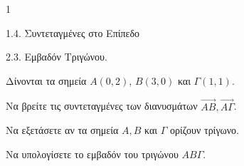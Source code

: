 \begin{ylh}{1}
    \item 1.4. Συντεταγμένες στο Επίπεδο
    \item 2.3. Εμβαδόν Τριγώνου.
\end{ylh}
Δίνονται τα σημεία $A(0,2)$, $B(3,0)$ και $\Gamma(1,1)$.
\begin{alist}
\item Να βρείτε τις συντεταγμένες των διανυσμάτων $\overrightarrow{AB}, \overrightarrow{A\Gamma}$. 
\item
    \begin{rlist}
    \item Να εξετάσετε αν τα σημεία $A, B$ και $\Gamma$ ορίζουν τρίγωνο. 
    \item Να υπολογίσετε το εμβαδόν του τριγώνου $AB\Gamma$. 
    \end{rlist}
\end{alist}